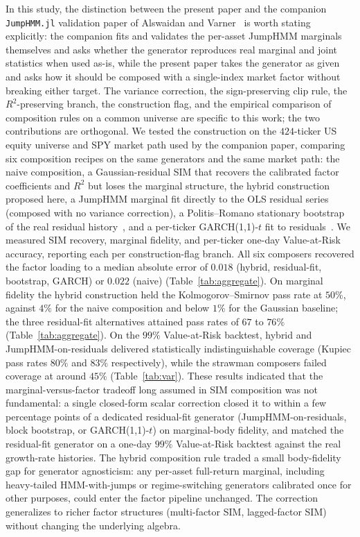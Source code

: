 In this study, the distinction between the present paper and the
companion \texttt{JumpHMM.jl} validation paper of Alswaidan and
Varner~\cite{alswaidanVarner2026jdiq} is worth stating explicitly:
the companion fits and validates the per-asset JumpHMM marginals
themselves and asks whether the generator reproduces real marginal
and joint statistics when used as-is, while the present paper takes
the generator as given and asks how it should be composed with a
single-index market factor without breaking either target. The
variance correction, the sign-preserving clip rule, the
$R^2$-preserving branch, the construction flag, and the empirical
comparison of composition rules on a common universe are specific
to this work; the two contributions are orthogonal. We tested the
construction on the $424$-ticker US equity universe and SPY market
path used by the companion paper, comparing six composition recipes
on the same generators and the same market path: the naive
composition, a Gaussian-residual SIM that recovers the calibrated
factor coefficients and $R^2$ but loses the marginal structure, the
hybrid construction proposed here, a JumpHMM marginal fit directly
to the OLS residual series (composed with no variance correction),
a Politis--Romano stationary bootstrap of the real residual
history~\cite{politisRomano1994}, and a per-ticker GARCH(1,1)-$t$
fit to residuals~\cite{bollerslev1986}. We measured SIM recovery,
marginal fidelity, and per-ticker one-day Value-at-Risk accuracy,
reporting each per construction-flag branch. All six composers
recovered the factor loading to a median absolute error of $0.018$
(hybrid, residual-fit, bootstrap, GARCH) or $0.022$ (naive)
(Table~\ref{tab:aggregate}). On marginal fidelity the hybrid
construction held the Kolmogorov--Smirnov pass rate at $50\%$,
against $4\%$ for the naive composition and below $1\%$ for the
Gaussian baseline; the three residual-fit alternatives attained
pass rates of $67$ to $76\%$ (Table~\ref{tab:aggregate}). On the
$99\%$ Value-at-Risk backtest, hybrid and JumpHMM-on-residuals
delivered statistically indistinguishable coverage (Kupiec pass
rates $80\%$ and $83\%$ respectively), while the strawman composers
failed coverage at around $45\%$ (Table~\ref{tab:var}). These results indicated that the marginal-versus-factor tradeoff
long assumed in SIM composition was not fundamental: a single
closed-form scalar correction closed it to within a few percentage
points of a dedicated residual-fit generator (JumpHMM-on-residuals,
block bootstrap, or GARCH(1,1)-$t$) on marginal-body fidelity, and
matched the residual-fit generator on a one-day $99\%$ Value-at-Risk
backtest against the real growth-rate histories. The hybrid
composition rule traded a small body-fidelity gap for generator
agnosticism: any per-asset full-return marginal, including
heavy-tailed HMM-with-jumps or regime-switching generators
calibrated once for other purposes, could enter the factor pipeline
unchanged. The correction generalizes to richer factor structures
(multi-factor SIM, lagged-factor SIM) without changing the
underlying algebra.